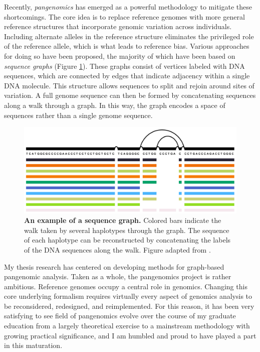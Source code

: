 \documentclass[11pt]{ucthesis}
\begin{document}
Recently, \emph{pangenomics} has emerged as a powerful methodology to mitigate these shortcomings. The core idea is to replace reference genomes with more general reference structures that incorporate genomic variation across individuals. Including alternate alleles in the reference structure eliminates the privileged role of the reference allele, which is what leads to reference bias. Various approaches for doing so have been proposed, the majority of which have been based on \emph{sequence graphs} (Figure \ref{fig:graph_example}). These graphs consist of vertices labeled with DNA sequences, which are connected by edges that indicate adjacency within a single DNA molecule. This structure allows sequences to split and rejoin around sites of variation. A full genome sequence can then be formed by concatenating sequences along a walk through a graph. In this way, the graph encodes a space of sequences rather than a single genome sequence.

\begin{figure}[h]
\begin{center}
\includegraphics[width=.75\textwidth]{introfigures/pangenome_graph.png}
\caption{\textbf{An example of a sequence graph.} Colored bars indicate the walk taken by several haplotypes through the graph. The sequence of each haplotype can be reconstructed by concatenating the labels of the DNA sequences along the walk. Figure adapted from \cite{Garrison_2019}.
} \label{fig:graph_example}
\end{center}
\end{figure}

My thesis research has centered on developing methods for graph-based pangenomic analysis. Taken as a whole, the pangenomics project is rather ambitious. Reference genomes occupy a central role in genomics. Changing this core underlying formalism requires virtually every aspect of genomics analysis to be reconsidered, redesigned, and reimplemented. For this reason, it has been very satisfying to see field of pangenomics evolve over the course of my graduate education from a largely theoretical exercise to a mainstream methodology with growing practical significance, and I am humbled and proud to have played a part in this maturation.
\end{document}
